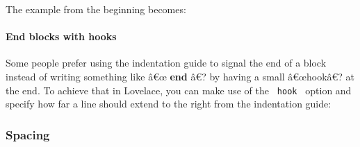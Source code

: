 The example from the beginning becomes:

\begin{Shaded}
\begin{Highlighting}[]
\NormalTok{\#pseudocode{-}list(stroke: none)[}
\NormalTok{]}
\end{Highlighting}
\end{Shaded}

\pandocbounded{}

\paragraph{End blocks with hooks}\label{end-blocks-with-hooks}

Some people prefer using the indentation guide to signal the end of a
block instead of writing something like â€œ \textbf{end} â€? by having a
small â€œhookâ€? at the end. To achieve that in Lovelace, you can make
use of the \texttt{\ hook\ } option and specify how far a line should
extend to the right from the indentation guide:

\begin{Shaded}
\begin{Highlighting}[]
\NormalTok{\#pseudocode{-}list(hooks: .5em)[}
\NormalTok{]}
\end{Highlighting}
\end{Shaded}

\pandocbounded{}

\subsubsection{Spacing}\label{spacing}

